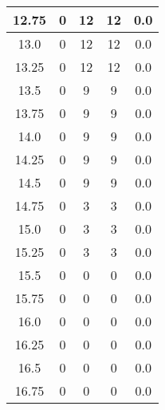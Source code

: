 \documentclass[letterpaper, 12pt]{article}
\begin{document}
\begin{longtable}{|c|c|c|c|c|}
\hline
12.75 & 0 & 12 & 12 & 0.0 \\
\hline
13.0 & 0 & 12 & 12 & 0.0 \\
\hline
13.25 & 0 & 12 & 12 & 0.0 \\
\hline
13.5 & 0 & 9 & 9 & 0.0 \\
\hline
13.75 & 0 & 9 & 9 & 0.0 \\
\hline
14.0 & 0 & 9 & 9 & 0.0 \\
\hline
14.25 & 0 & 9 & 9 & 0.0 \\
\hline
14.5 & 0 & 9 & 9 & 0.0 \\
\hline
14.75 & 0 & 3 & 3 & 0.0 \\
\hline
15.0 & 0 & 3 & 3 & 0.0 \\
\hline
15.25 & 0 & 3 & 3 & 0.0 \\
\hline
15.5 & 0 & 0 & 0 & 0.0 \\
\hline
15.75 & 0 & 0 & 0 & 0.0 \\
\hline
16.0 & 0 & 0 & 0 & 0.0 \\
\hline
16.25 & 0 & 0 & 0 & 0.0 \\
\hline
16.5 & 0 & 0 & 0 & 0.0 \\
\hline
16.75 & 0 & 0 & 0 & 0.0 \\
\hline
\end{longtable}
\end{document}
